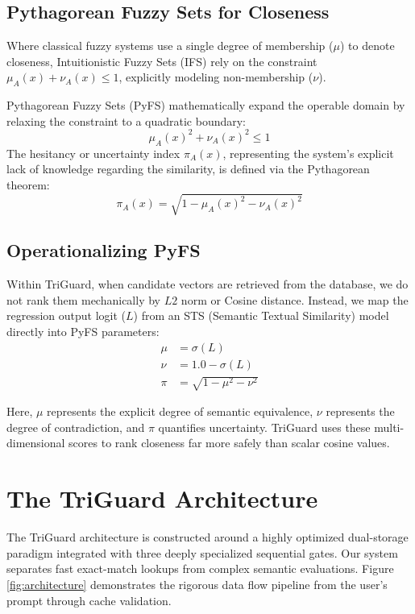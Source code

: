 \documentclass[sigconf]{acmart}
\begin{document}
\subsection{Pythagorean Fuzzy Sets for Closeness}
Where classical fuzzy systems use a single degree of membership ($\mu$) to denote closeness, Intuitionistic Fuzzy Sets (IFS) rely on the constraint $\mu_A(x) + \nu_A(x) \leq 1$, explicitly modeling non-membership ($\nu$).

Pythagorean Fuzzy Sets (PyFS) mathematically expand the operable domain by relaxing the constraint to a quadratic boundary:
\begin{equation}
    \mu_A(x)^2 + \nu_A(x)^2 \leq 1
\end{equation}
The hesitancy or uncertainty index $\pi_A(x)$, representing the system's explicit lack of knowledge regarding the similarity, is defined via the Pythagorean theorem:
\begin{equation}
    \pi_A(x) = \sqrt{1 - \mu_A(x)^2 - \nu_A(x)^2}
\end{equation}

\subsection{Operationalizing PyFS}
Within TriGuard, when candidate vectors are retrieved from the database, we do not rank them mechanically by $L2$ norm or Cosine distance. Instead, we map the regression output logit ($L$) from an STS (Semantic Textual Similarity) model directly into PyFS parameters:
\begin{align}
    \mu &= \sigma(L) \\
    \nu &= 1.0 - \sigma(L) \\
    \pi &= \sqrt{1 - \mu^2 - \nu^2}
\end{align}

Here, $\mu$ represents the explicit degree of semantic equivalence, $\nu$ represents the degree of contradiction, and $\pi$ quantifies uncertainty. TriGuard uses these multi-dimensional scores to rank closeness far more safely than scalar cosine values.

\section{The TriGuard Architecture}

The TriGuard architecture is constructed around a highly optimized dual-storage paradigm integrated with three deeply specialized sequential gates. Our system separates fast exact-match lookups from complex semantic evaluations. Figure \ref{fig:architecture} demonstrates the rigorous data flow pipeline from the user's prompt through cache validation.
\end{document}
